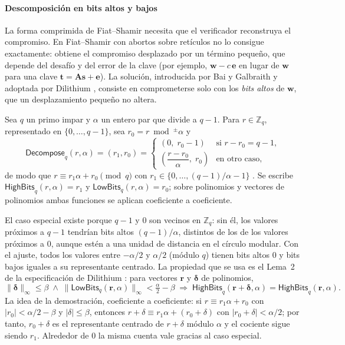 \paragraph{Descomposición en bits altos y bajos}
\label{sec:highbits}
La forma comprimida de Fiat--Shamir necesita que el verificador reconstruya el compromiso. En Fiat--Shamir con abortos sobre retículos no lo consigue exactamente: obtiene el compromiso desplazado por un término pequeño, que depende del desafío y del error de la clave (por ejemplo, $\mathbf{w} - c\,\mathbf{e}$ en lugar de $\mathbf{w}$ para una clave $\mathbf{t} = \mathbf{A}\mathbf{s} + \mathbf{e}$). La solución, introducida por Bai y Galbraith \cite{bai2014improved} y adoptada por Dilithium \cite{ducas2018crystals, bai2021dilithium}, consiste en comprometerse solo con los \textit{bits altos} de $\mathbf{w}$, que un desplazamiento pequeño no altera.

Sea $q$ un primo impar y $\alpha$ un entero par que divide a $q-1$. Para $r \in \mathbb{Z}_{q}$, representado en $\{0, \dots, q-1\}$, sea $r_0 = r \bmod^{\pm} \alpha$ y
\begin{equation}
\mathsf{Decompose}_{q}(r, \alpha) = (r_1, r_0) =
\begin{cases}
(0,\; r_0 - 1) & \text{si } r - r_0 = q - 1, \\[2pt]
\left(\dfrac{r - r_0}{\alpha},\; r_0\right) & \text{en otro caso,}
\end{cases}
\end{equation}
de modo que $r \equiv r_1 \alpha + r_0 \pmod{q}$ con $r_1 \in \{0, \dots, (q-1)/\alpha - 1\}$ \cite{bai2021dilithium}. Se escribe $\mathsf{HighBits}_{q}(r, \alpha) = r_1$ y $\mathsf{LowBits}_{q}(r, \alpha) = r_0$; sobre polinomios y vectores de polinomios ambas funciones se aplican coeficiente a coeficiente.

El caso especial existe porque $q-1$ y $0$ son vecinos en $\mathbb{Z}_{q}$: sin él, los valores próximos a $q-1$ tendrían bits altos $(q-1)/\alpha$, distintos de los de los valores próximos a $0$, aunque estén a una unidad de distancia en el círculo modular. Con el ajuste, todos los valores entre $-\alpha/2$ y $\alpha/2$ (módulo $q$) tienen bits altos $0$ y bits bajos iguales a su representante centrado. La propiedad que se usa es el Lema~2 de la especificación de Dilithium \cite{bai2021dilithium}: para vectores $\mathbf{r}$ y $\boldsymbol{\delta}$ de polinomios,
\begin{equation}
\|\boldsymbol{\delta}\|_\infty \le \beta \;\wedge\; \big\|\mathsf{LowBits}_{q}(\mathbf{r},\alpha)\big\|_\infty < \tfrac{\alpha}{2} - \beta
\;\Longrightarrow\; \mathsf{HighBits}_{q}(\mathbf{r}+\boldsymbol{\delta},\alpha) = \mathsf{HighBits}_{q}(\mathbf{r},\alpha).
\label{eq:lema-highbits}
\end{equation}
La idea de la demostración, coeficiente a coeficiente: si $r \equiv r_1\alpha + r_0$ con $|r_0| < \alpha/2 - \beta$ y $|\delta| \le \beta$, entonces $r + \delta \equiv r_1\alpha + (r_0 + \delta)$ con $|r_0 + \delta| < \alpha/2$; por tanto, $r_0 + \delta$ es el representante centrado de $r + \delta$ módulo $\alpha$ y el cociente sigue siendo $r_1$. Alrededor de $0$ la misma cuenta vale gracias al caso especial.

